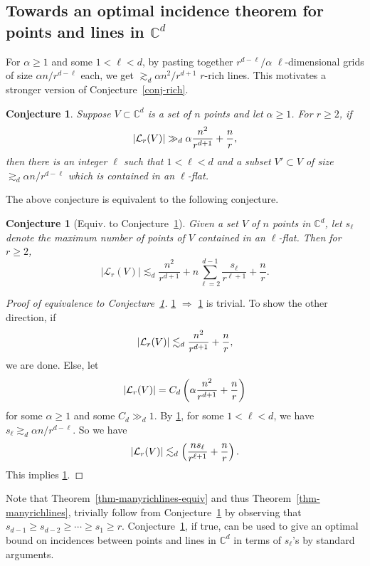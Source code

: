 \documentclass[11pt]{article}
\newtheorem{conjecture}[thm]{Conjecture}
\def\L{{\mathcal L}}
\def\C{{\mathbb{C}}}
\def\cL{{\cal L}}
\begin{document}
\begin{appendix}




\section{Towards an optimal incidence theorem for points and lines in $\C^d$}
\label{sec-stronger-thm1}

For $\alpha \ge 1$ and some $1<\ell<d$, by pasting together $r^{d-\ell}/\alpha$ $\ell$-dimensional grids of size $\alpha n/r^{d-\ell}$ each, we get $\gtrsim_d \alpha n^2/r^{d+1}$ $r$-rich lines. This motivates a stronger version of Conjecture~\ref{conj-rich}.

\begin{conjecture}\label{conj-stronger}
Suppose $V \subset \C^d$ is a set of $n$ points and let $\alpha\ge 1$. For $r\ge 2$, if $$|\cL_r(V)| \gg_d \alpha\frac{n^2}{r^{d+1}}+\frac{n}{r},$$ then there is an integer $\ell$ such that $1<\ell<d$ and a subset $V' \subset V$ of size $ \gtrsim_d \alpha n/r^{d-\ell}$ which is contained in an $\ell$-flat.
\end{conjecture}

The above conjecture is equivalent to the following conjecture.
\begin{conjecture}[Equiv. to Conjecture~\ref{conj-stronger}]
\label{conj-equivalent-formulation}
Given a set $V$ of $n$ points in $\C^d$, let $s_\ell$ denote the maximum number of points of $V$ contained in an $\ell$-flat. Then for $r\ge 2$,
$$|\L_r(V)|\lesssim_d \frac{n^2}{r^{d+1}}+n\sum_{\ell=2}^{d-1}\frac{s_\ell}{r^{\ell+1}}+\frac{n}{r}.$$
\end{conjecture}
\begin{proof}[Proof of equivalence to Conjecture~\ref{conj-stronger}]
\ref{conj-equivalent-formulation} $\Rightarrow$ \ref{conj-stronger} is trivial. To show the other direction, if
$$|\cL_r(V)| \lesssim_d  \frac{n^2}{r^{d+1}}+\frac{n}{r},$$ we are done. Else, let 
$$|\cL_r(V)| = C_d\left( \alpha\frac{n^2}{r^{d+1}}+\frac{n}{r}\right)$$ for some $\alpha\ge 1$ and some $C_d\gg_d 1$. By \ref{conj-stronger}, for some $1<\ell<d$, we have $s_\ell \gtrsim_d \alpha n/r^{d-\ell}$. So we have  
$$|\cL_r(V)| \lesssim_d \left( \frac{ns_\ell}{r^{\ell+1}}+\frac{n}{r}\right).$$ This implies \ref{conj-equivalent-formulation}.
\end{proof}
Note that Theorem~\ref{thm-manyrichlines-equiv} and thus Theorem~\ref{thm-manyrichlines}, trivially follow from Conjecture~\ref{conj-equivalent-formulation} by observing that $s_{d-1}\ge s_{d-2}\ge \cdots \ge s_1 \ge r$. Conjecture~\ref{conj-equivalent-formulation}, if true, can be used to give an optimal bound on incidences between points and lines in $\C^d$ in terms of $s_\ell$'s by standard arguments.


\end{appendix}
\end{document}
